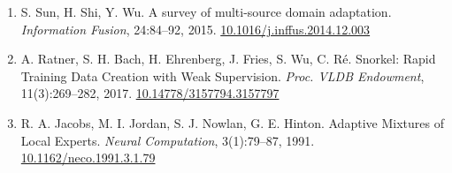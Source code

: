 \begin{enumerate}
{  22(10):1345--1359, 2010.
  \href{https://doi.org/10.1109/TKDE.2009.191}{10.1109/TKDE.2009.191}}
\item
  \label{r50}{S. Sun, H. Shi, Y. Wu. A survey of
  multi-source domain adaptation. \emph{Information Fusion}, 24:84--92,
  2015.
  \href{https://doi.org/10.1016/j.inffus.2014.12.003}{10.1016/j.inffus.2014.12.003}}
\item
  \label{r51}{A. Ratner, S. H. Bach, H. Ehrenberg, J.
  Fries, S. Wu, C. Ré. Snorkel: Rapid Training Data Creation with Weak
  Supervision. \emph{Proc. VLDB Endowment}, 11(3):269--282, 2017.
  \href{https://doi.org/10.14778/3157794.3157797}{10.14778/3157794.3157797}}
\item
  \label{r52}{R. A. Jacobs, M. I. Jordan, S. J. Nowlan,
  G. E. Hinton. Adaptive Mixtures of Local Experts. \emph{Neural
  Computation}, 3(1):79--87, 1991.
  \href{https://doi.org/10.1162/neco.1991.3.1.79}{10.1162/neco.1991.3.1.79}}
\end{enumerate}
